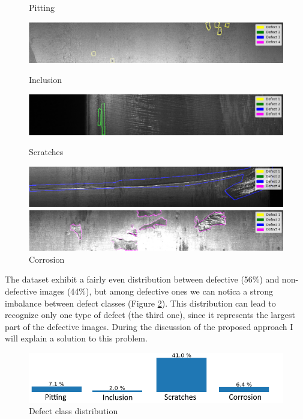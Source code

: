 \documentclass[10pt,twocolumn,letterpaper]{article}
\begin{document}
   \begin{figure}[h]
      \centering
      \caption{Pitting} \label{fig:defect1}
      \includegraphics[scale=0.3]{Img_Defect1}
      \caption{Inclusion} \label{fig:defect2}
      \includegraphics[scale=0.3]{Img_Defect2}
      \caption{Scratches} \label{fig:defect3}
      \includegraphics[scale=0.3]{Img_Defect3}
      \caption{Corrosion} \label{fig:defect4}
      \includegraphics[scale=0.3]{Img_Defect4}
   \end{figure}

   The dataset exhibit a fairly even distribution between defective (56\%) and non-defective images (44\%), but among defective ones we can notica a strong imbalance between defect classes (Figure \ref{fig:classImbalance}). This distribution can lead to recognize only one type of defect (the third one), since it represents the largest part of the defective images. During the discussion of the proposed approach I will explain a solution to this problem.

   \begin{figure}[h]
      \centering
      \caption{Defect class distribution} \label{fig:classImbalance}
      \includegraphics[scale=0.45]{Img_ClassImbalance}
   \end{figure}
\end{document}

